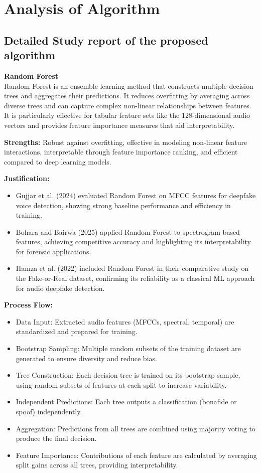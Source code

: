 \documentclass[12pt,a4paper]{report}
\begin{document}
\section{Analysis of Algorithm}

\subsection{Detailed Study report of the proposed algorithm}

\textbf{Random Forest} \\
Random Forest is an ensemble learning method that constructs multiple decision trees and aggregates their predictions. 
It reduces overfitting by averaging across diverse trees and can capture complex non-linear relationships between features. 
It is particularly effective for tabular feature sets like the 128-dimensional audio vectors and provides feature importance measures that aid interpretability.

\textbf{Strengths:}  
Robust against overfitting, effective in modeling non-linear feature interactions, interpretable through feature importance ranking, 
and efficient compared to deep learning models.

\textbf{Justification:}  
\begin{itemize}[itemsep=.2pt, topsep=1pt]
    \item Gujjar et al. (2024) evaluated Random Forest on MFCC features for deepfake voice detection, showing strong baseline performance and efficiency in training.
    \item Bohara and Bairwa (2025) applied Random Forest to spectrogram-based features, achieving competitive accuracy and highlighting its interpretability for forensic applications.
    \item Hamza et al. (2022) included Random Forest in their comparative study on the Fake-or-Real dataset, confirming its reliability as a classical ML approach for audio deepfake detection.
\end{itemize}

\textbf{Process Flow:}  
\begin{itemize}[itemsep=.2pt, topsep=1pt]
    \item Data Input: Extracted audio features (MFCCs, spectral, temporal) are standardized and prepared for training.
    \item Bootstrap Sampling: Multiple random subsets of the training dataset are generated to ensure diversity and reduce bias.
    \item Tree Construction: Each decision tree is trained on its bootstrap sample, using random subsets of features at each split to increase variability.
    \item Independent Predictions: Each tree outputs a classification (bonafide or spoof) independently.
    \item Aggregation: Predictions from all trees are combined using majority voting to produce the final decision.
    \item Feature Importance: Contributions of each feature are calculated by averaging split gains across all trees, providing interpretability.
\end{itemize}
\end{document}
